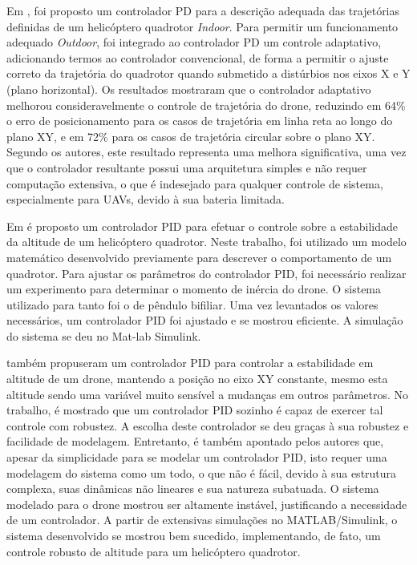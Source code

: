 Em \cite{Razinkova2014}, foi proposto um controlador PD para a descrição adequada das trajetórias definidas de um helicóptero quadrotor \textit{Indoor}. Para permitir um funcionamento adequado \textit{Outdoor}, foi integrado ao controlador PD um controle adaptativo, adicionando termos ao controlador convencional, de forma a permitir o ajuste correto da trajetória do quadrotor quando submetido a distúrbios nos eixos X e Y (plano horizontal). Os resultados mostraram que o controlador adaptativo melhorou consideravelmente o controle de trajetória do drone, reduzindo em 64\% o erro de posicionamento para os casos de trajetória em linha reta ao longo do plano XY, e em 72\% para os casos de trajetória circular sobre o plano XY. Segundo os autores, este resultado representa uma melhora significativa, uma vez que o controlador resultante possui uma arquitetura simples e não requer computação extensiva, o que é indesejado para qualquer controle de sistema, especialmente para UAVs, devido à sua bateria limitada.

Em \cite{Mustapa2014} é proposto um controlador PID para efetuar o controle sobre a estabilidade da altitude de um helicóptero quadrotor. Neste trabalho, foi utilizado um modelo matemático desenvolvido previamente para descrever o comportamento de um quadrotor. Para ajustar os parâmetros do controlador PID, foi necessário realizar um experimento para determinar o momento de inércia do drone. O sistema utilizado para tanto foi o de pêndulo bifiliar. Uma vez levantados os valores necessários, um controlador PID foi ajustado e se mostrou eficiente. A simulação do sistema se deu no Mat-lab Simulink.

 também propuseram um controlador PID para controlar a estabilidade em altitude de um drone, mantendo a posição no eixo XY constante, mesmo esta altitude sendo uma variável muito sensível a mudanças em outros parâmetros. No trabalho, é mostrado que um controlador PID sozinho é capaz de exercer tal controle com robustez. A escolha deste controlador se deu graças à sua robustez e facilidade de modelagem. Entretanto, é também apontado pelos autores que, apesar da simplicidade para se modelar um controlador PID, isto requer uma modelagem do sistema como um todo, o que não é fácil, devido à sua estrutura complexa, suas dinâmicas não lineares e sua natureza subatuada. O sistema modelado para o drone mostrou ser altamente instável, justificando a necessidade de um controlador. A partir de extensivas simulações no MATLAB/Simulink, o sistema desenvolvido se mostrou bem sucedido, implementando, de fato, um controle robusto de altitude para um helicóptero quadrotor.

